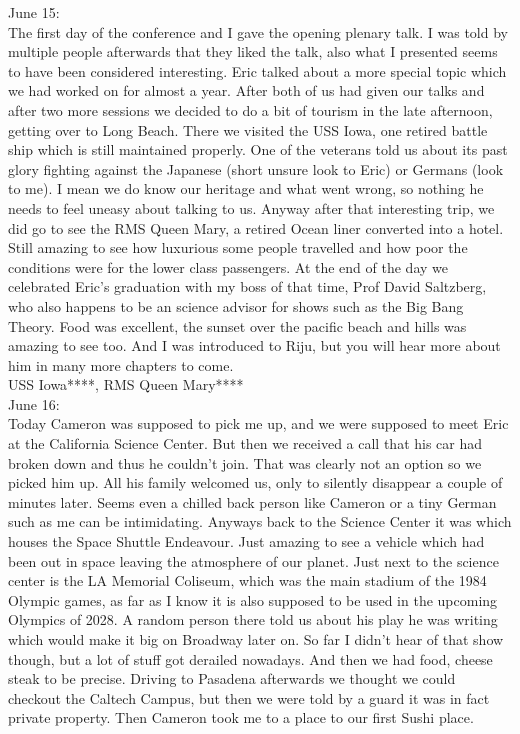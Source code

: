 June 15:\\
The first day of the conference and I gave the opening plenary talk. I was told by multiple people afterwards that they liked the talk, also what I presented seems to have been considered interesting. Eric talked about a more special topic which we had worked on for almost a year. After both of us had given our talks and after two more sessions we decided to do a bit of tourism in the late afternoon, getting over to Long Beach. There we visited the USS Iowa, one retired battle ship which is still maintained properly. One of the veterans told us about its past glory fighting against the Japanese (short unsure look to Eric) or Germans (look to me). I mean we do know our heritage and what went wrong, so nothing he needs to feel uneasy about talking to us. Anyway after that interesting trip, we did go to see the RMS Queen Mary, a retired Ocean liner converted into a hotel. Still amazing to see how luxurious some people travelled and how poor the conditions were for the lower class passengers. At the end of the day we celebrated Eric's graduation with my boss of that time, Prof David Saltzberg, who also happens to be an science advisor for shows such as the Big Bang Theory. Food was excellent, the sunset over the pacific beach and hills was amazing to see too. And I was introduced to Riju, but you will hear more about him in many more chapters to come.\\

USS Iowa****, RMS Queen Mary****\\

June 16:\\
Today Cameron was supposed to pick me up, and we were supposed to meet Eric at the California Science Center. But then we received a call that his car had broken down and thus he couldn't join. That was clearly not an option so we picked him up. All his family welcomed us, only to silently disappear a couple of minutes later. Seems even a chilled back person like Cameron or a tiny German such as me can be intimidating. Anyways back to the Science Center it was which houses the Space Shuttle Endeavour. Just amazing to see a vehicle which had been out in space leaving the atmosphere of our planet. Just next to the science center is the LA Memorial Coliseum, which was the main stadium of the 1984 Olympic games, as far as I know it is also supposed to be used in the upcoming Olympics of 2028. A random person there told us about his play he was writing which would make it big on Broadway later on. So far I didn't hear of that show though, but a lot of stuff got derailed nowadays. And then we had food, cheese steak to be precise. Driving to Pasadena afterwards we thought we could checkout the Caltech Campus, but then we were told by a guard it was in fact private property. Then Cameron took me to a place to our first Sushi place.

